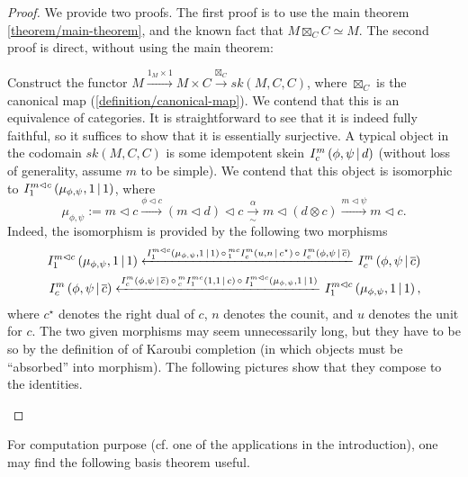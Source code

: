 \begin{proof}
  We provide two proofs. The first proof is to use the main theorem
  \ref{theorem/main-theorem}, and the known fact that $M \boxtimes_{C} C
  \simeq M$. The second proof is direct, without using the main theorem:

  Construct the functor $M \xrightarrow{1_{M} \times 1} M \times C
  \xrightarrow{\boxtimes_{C}} sk(M,C,C)$, where $\boxtimes_{C}$ is the
  canonical map (\ref{definition/canonical-map}). We contend that this is an
  equivalence of categories. It is straightforward to see that it is indeed
  fully faithful, so it suffices to show that it is essentially surjective. A
  typical object in the codomain $sk(M,C,C)$ is some idempotent skein
  ${}^{}_{} I^{m}_{c} \left( \phi, \psi \,\middle|\, d \right)$ (without loss of generality, assume $m$ to be
  simple). We contend that this object is isomorphic to ${}^{}_{} I^{m \lhd
    c}_{1} \left( \mu_{\phi, \psi}, 1 \,\middle|\, 1 \right)$, where
  \[
    \mu_{\phi,\psi} :=
    m \lhd c
    \xrightarrow{\phi \lhd c}
    (m \lhd d) \lhd c
    \xrightarrow[\sim]{\alpha}
    m \lhd (d \otimes c)
    \xrightarrow{m \lhd \psi}
    m \lhd c.
  \]
  Indeed, the isomorphism is provided by the following two morphisms
  \begin{align*}
    {}^{}_{} I^{m \lhd c}_{1} \left( \mu_{\phi, \psi}, 1 \,\middle|\, 1 \right)
    \xleftarrow{
    {}^{}_{} I^{m \lhd c}_{1} \left( \mu_{\phi, \psi}, 1 \,\middle|\, 1 \right)
    \, \circ \,
    {}^{mc}_{1} I^{m}_{c} \left( u, n \,\middle|\, c^{\star} \right)
    \, \circ \,
    {}^{}_{} I^{m}_{c} \left( \phi, \psi \,\middle|\, \overline{c} \right)}
    {}^{}_{} I^{m}_{c} \left( \phi, \psi \,\middle|\, \overline{c} \right)
    \\
    {}^{}_{} I^{m}_{c} \left( \phi, \psi \,\middle|\, \overline{c} \right)
    \xleftarrow{
    {}^{}_{} I^{m}_{c} \left( \phi, \psi \,\middle|\, \overline{c} \right)
    \, \circ \,
    {}^{m}_{c} I^{mc}_{1} \left( 1, 1 \,\middle|\, c \right)
    \, \circ \,
    {}^{}_{} I^{m \lhd c}_{1} \left( \mu_{\phi, \psi}, 1 \,\middle|\, 1 \right)
    }
    {}^{}_{} I^{m \lhd c}_{1} \left( \mu_{\phi, \psi}, 1 \,\middle|\, 1 \right),
  \end{align*}
  where $c^{\star}$ denotes the right dual of $c$, $n$ denotes the counit, and
  $u$ denotes the unit for $c$. The two given morphisms may seem unnecessarily
  long, but they have to be so by the definition of of Karoubi completion (in
  which objects must be ``absorbed'' into morphism). The following pictures
  show that they compose to the identities.

  \begin{center}
    
  \end{center}
\end{proof}

\noindent For computation purpose (cf. one of the applications in the
introduction), one may find the following basis theorem useful.

